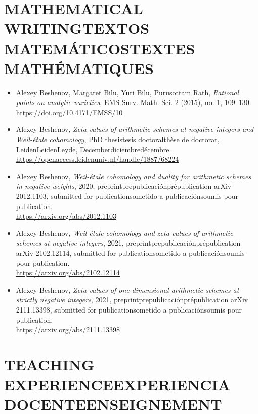 \documentclass{article}
\newcommand{\biling}[3]{\ifdefined\english#1\fi\ifdefined\spanish#2\fi\ifdefined\french#3\fi}
\begin{document}
{\color{RoyalBlue}\section*{\biling{MATHEMATICAL WRITING}{TEXTOS MATEMÁTICOS}{TEXTES MATHÉMATIQUES}}}

\begin{itemize}
\item Alexey Beshenov, Margaret Bilu, Yuri Bilu, Purusottam Rath,
  \emph{Rational points on analytic varieties},
  EMS Surv. Math. Sci. 2 (2015), no. 1, 109–130.\\
  \url{https://doi.org/10.4171/EMSS/10}

\item Alexey Beshenov,
  \emph{Zeta-values of arithmetic schemes at negative integers and Weil-étale cohomology},
  \biling{PhD thesis}{tesis doctoral}{thèse de doctorat}, \biling{Leiden}{Leiden}{Leyde}, \biling{December}{diciembre}{décembre} 2018.\\
  \url{https://openaccess.leidenuniv.nl/handle/1887/68224}

\item Alexey Beshenov,
  \emph{Weil-étale cohomology and duality for arithmetic schemes in negative weights},
  2020, \biling{preprint}{prepublicación}{prépublication} arXiv 2012.1103,
  \biling{submitted for publication}{sometido a publicación}{soumis pour publication}.\\
  \url{https://arxiv.org/abs/2012.1103}

\item Alexey Beshenov,
  \emph{Weil-étale cohomology and zeta-values of arithmetic schemes at negative integers},
  2021, \biling{preprint}{prepublicación}{prépublication} arXiv 2102.12114,
  \biling{submitted for publication}{sometido a publicación}{soumis pour publication}.\\
  \url{https://arxiv.org/abs/2102.12114}

\item Alexey Beshenov,
  \emph{Zeta-values of one-dimensional arithmetic schemes at strictly negative integers},
  2021, \biling{preprint}{prepublicación}{prépublication} arXiv 2111.13398,
  \biling{submitted for publication}{sometido a publicación}{soumis pour publication}.\\
  \url{https://arxiv.org/abs/2111.13398}
\end{itemize}

{\color{RoyalBlue}\section*{\biling{TEACHING EXPERIENCE}{EXPERIENCIA DOCENTE}{ENSEIGNEMENT}}}
\end{document}
